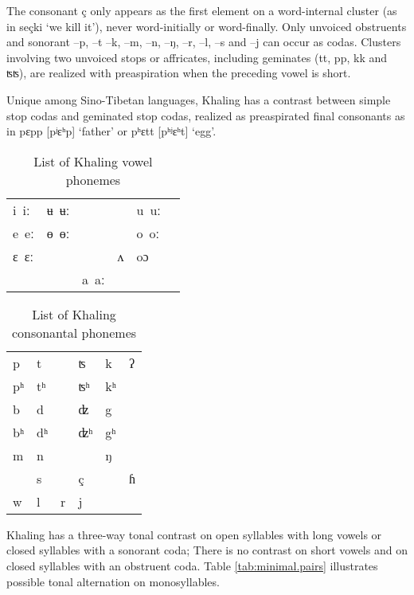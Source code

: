\documentclass[oldfontcommands,oneside,a4paper,11pt]{article}
\newcommand{\ipa}[1]{{\phon \mbox{#1}}} %
\begin{document}
The consonant \ipa{ç} only appears as the first element on a word-internal cluster (as in \ipa{seçki} `we kill it'), never word-initially or word-finally. Only unvoiced obstruents and sonorant \ipa{--p}, \ipa{--t} \ipa{--k}, \ipa{--m}, \ipa{--n}, \ipa{--ŋ}, \ipa{--r}, \ipa{--l}, \ipa{--s} and \ipa{--j} can occur as codas. Clusters involving two unvoiced stops or affricates, including geminates (\ipa{tt}, \ipa{pp}, \ipa{kk} and \ipa{ʦʦ}), are realized with preaspiration when the preceding vowel is short.

Unique among Sino-Tibetan languages, Khaling has a contrast between simple stop codas and geminated stop codas, realized as preaspirated final consonants as in \ipa{pɛpp} [pʲɛʰp] `father'  or \ipa{pʰɛtt} [pʰʲɛʰt] `egg'.

\begin{table}
\caption{List of Khaling vowel phonemes} \label{tab:vowels}\centering
\begin{tabular}{llllll}
\ipa{i iː} & \ipa{ʉ ʉː} & &&\ipa{u uː} \\
\ipa{e eː} & \ipa{ɵ ɵː} & &&\ipa{o oː} \\
\ipa{ɛ ɛː} &   & &\ipa{ʌ} &  \ipa{oɔ} \\
&&\ipa{a aː}\\
\end{tabular}
\end{table}

\begin{table}
\caption{List of Khaling consonantal phonemes} \label{tab:consonants}\centering
\begin{tabular}{llllll}
\ipa{p} & \ipa{t} &&\ipa{ʦ}  & \ipa{k}&\ipa{ʔ}\\
\ipa{pʰ} & \ipa{tʰ} &&\ipa{ʦʰ}  & \ipa{kʰ}&\\
\ipa{b} & \ipa{d} &&\ipa{ʣ}  & \ipa{g}&\\
\ipa{bʰ} & \ipa{dʰ} &&\ipa{ʣʰ}  & \ipa{gʰ}&\\
\ipa{m} & \ipa{n} && & \ipa{ŋ}&\\
  & \ipa{s} && \ipa{ç}& &\ipa{ɦ}\\
  \ipa{w} & \ipa{l} &\ipa{r}&\ipa{j}  & &\\
\end{tabular}
\end{table}

Khaling has a three-way tonal contrast on open syllables with long vowels or closed syllables with a sonorant coda; There is no contrast on short vowels and on closed syllables with an obstruent coda. Table \ref{tab:minimal.pairs} illustrates possible tonal alternation on monosyllables.
\end{document}
